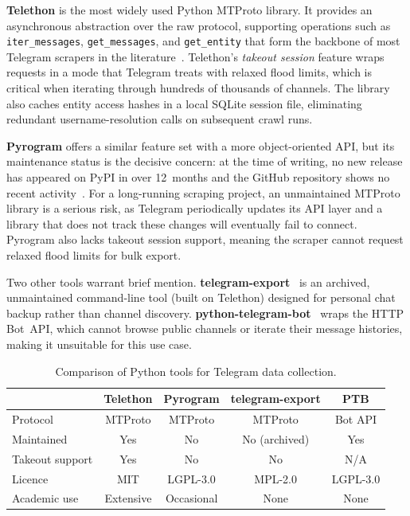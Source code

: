 \textbf{Telethon} is the most widely used Python MTProto library.
It provides an asynchronous abstraction over the raw protocol, supporting operations such as \texttt{iter\_messages}, \texttt{get\_messages}, and \texttt{get\_entity} that form the backbone of most Telegram scrapers in the literature~\cite{baumgartner2020,lamorgia2025,blas2025,propaganda2025}.
Telethon's \emph{takeout session} feature wraps requests in a mode that Telegram treats with relaxed flood limits, which is critical when iterating through hundreds of thousands of channels.
The library also caches entity access hashes in a local SQLite session file, eliminating redundant username-resolution calls on subsequent crawl runs.

\textbf{Pyrogram} offers a similar feature set with a more object-oriented API, but its maintenance status is the decisive concern: at the time of writing, no new release has appeared on PyPI in over 12~months and the GitHub repository shows no recent activity~\cite{pyrogram2024}.
For a long-running scraping project, an unmaintained MTProto library is a serious risk, as Telegram periodically updates its API layer and a library that does not track these changes will eventually fail to connect.
Pyrogram also lacks takeout session support, meaning the scraper cannot request relaxed flood limits for bulk export.

Two other tools warrant brief mention.
\textbf{telegram-export}~\cite{telegramexport2020} is an archived, unmaintained command-line tool (built on Telethon) designed for personal chat backup rather than channel discovery.
\textbf{python-telegram-bot}~\cite{pythontelegrambot2026} wraps the HTTP Bot~API, which cannot browse public channels or iterate their message histories, making it unsuitable for this use case.

\begin{table}[htbp]
\centering
\caption{Comparison of Python tools for Telegram data collection.}
\label{tab:tool-comparison}
\small
\begin{tabular}{@{}lcccc@{}}
\toprule
 & \textbf{Telethon} & \textbf{Pyrogram} & \textbf{telegram-export} & \textbf{PTB} \\
\midrule
Protocol        & MTProto & MTProto & MTProto & Bot API \\
Maintained      & Yes     & No      & No (archived) & Yes \\
Takeout support & Yes     & No      & No      & N/A \\
Licence         & MIT     & LGPL-3.0 & MPL-2.0 & LGPL-3.0 \\
Academic use    & Extensive & Occasional & None & None \\
\bottomrule
\end{tabular}
\end{table}

